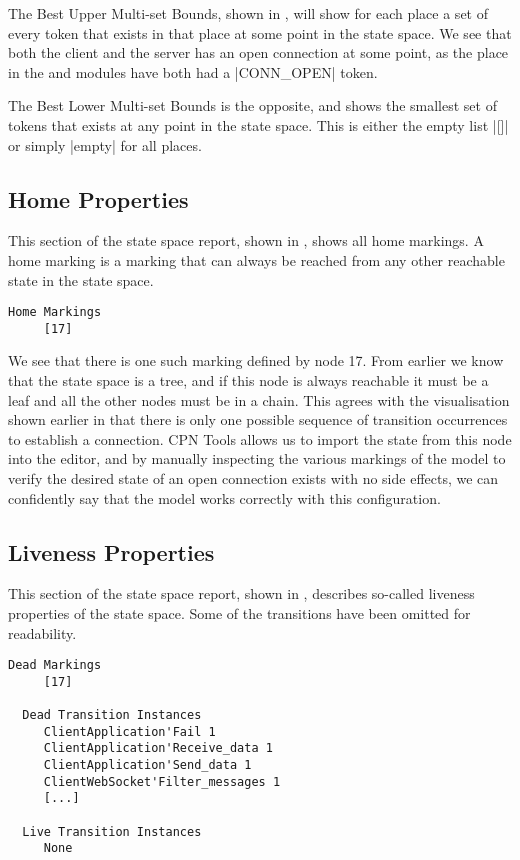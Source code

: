 	The Best Upper Multi-set Bounds, shown in , will show for each
	place a set of every token that exists in that place at some point in the state space. We see that both
	the client and the server has an open connection at some point, as the
	 place in the  and
	 modules have both had a |CONN_OPEN| token.
	
	The Best Lower Multi-set Bounds is the opposite, and shows the smallest set of
	tokens that exists at any point in the state space. This is either the empty
	list |[]| or simply |empty| for all places.
	
	\subsection{Home Properties}
	This section of the state space report, shown in , shows all
	home markings. A home marking is a marking that can always be reached from any
	other reachable state in the state space.
	
	\begin{lstlisting}[language={},float,label=lst:ssa_home,
	caption=State Space Report: Home Properties]
  Home Markings
     [17]
	\end{lstlisting}
	
	We see that there is one such marking defined by node 17. From earlier we know
	that the state space is a tree, and if this node is always reachable it must be a leaf
	and all the other nodes must be in a chain. This agrees with the visualisation
	shown earlier in  that there is only one possible
	sequence of transition occurrences to establish a connection. CPN Tools
	allows us to import the state from this node into the editor, and by manually
	inspecting the various markings of the model to verify the desired state of
	an open connection exists with no side effects, we can confidently say that the
	model works correctly with this configuration.
	
	\subsection{Liveness Properties}
	This section of the state space report, shown in ,
	describes so-called liveness properties of the state space.
	Some of the transitions have been omitted for readability.
	
	\begin{lstlisting}[language={},float,label=lst:ssa_liveness,
	caption=State Space Report: Liveness Properties]
  Dead Markings
     [17]

  Dead Transition Instances
     ClientApplication'Fail 1
     ClientApplication'Receive_data 1
     ClientApplication'Send_data 1
     ClientWebSocket'Filter_messages 1
     [...]

  Live Transition Instances
     None
	\end{lstlisting}
	
